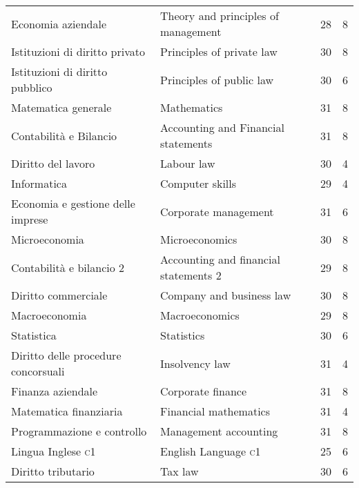 \documentclass[a4paper,10pt]{article}
\begin{document}
\begin{center}

  \tabletail{%
  }
  \tablelasttail{}

  \begin{supertabular}{p{4.9cm} p{4.9cm} c c}
    Economia aziendale&Theory and principles of management& 28 & 8\\
    Istituzioni di diritto privato&Principles of private law&30&8\\
    Istituzioni di diritto pubblico
    &
    Principles of public law
    & 30&
    6
    \\
    Matematica generale
    & Mathematics
    &31&8\\
    Contabilit\`a e Bilancio
    & Accounting and Financial statements
    & 31 & 8\\
    Diritto del lavoro
    &
    Labour law
    & 30&
    4
    \\
    Informatica & Computer skills &29& 4
    \\
    Economia e gestione delle imprese & Corporate management &31&6
    \\
    Microeconomia & Microeconomics &30&8
    \\
    Contabilit\`a e bilancio 2 & Accounting and financial statements 2
    &29&8 \\
    Diritto commerciale & Company and business law &30&8
    \\
    Macroeconomia & Macroeconomics &29&8
    \\
    Statistica & Statistics &30&6\\
    Diritto delle procedure concorsuali & Insolvency law &31&4
    \\
    Finanza aziendale
    & Corporate finance
    &31 &8 \\
    Matematica finanziaria & Financial mathematics &31&4
    \\
    Programmazione e controllo
    & Management accounting &31&8
    \\
    Lingua Inglese \textsc{c1}& English Language \textsc{c1}& 25&6\\
    Diritto tributario & Tax law &30&6

\end{supertabular}
\end{center}
\end{document}
